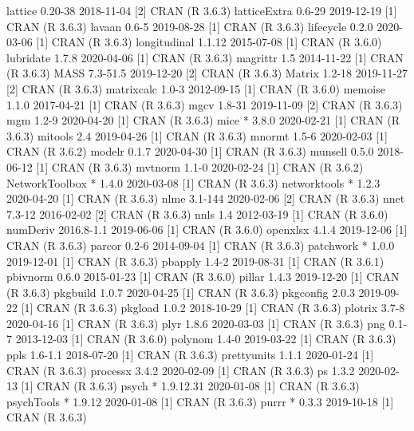 \documentclass[a4paper,12pt]{article} %
\begin{document}
{\begin{Schunk}
\begin{Soutput}
 lattice          0.20-38    2018-11-04 [2] CRAN (R 3.6.3)
 latticeExtra     0.6-29     2019-12-19 [1] CRAN (R 3.6.3)
 lavaan           0.6-5      2019-08-28 [1] CRAN (R 3.6.3)
 lifecycle        0.2.0      2020-03-06 [1] CRAN (R 3.6.3)
 longitudinal     1.1.12     2015-07-08 [1] CRAN (R 3.6.0)
 lubridate        1.7.8      2020-04-06 [1] CRAN (R 3.6.3)
 magrittr         1.5        2014-11-22 [1] CRAN (R 3.6.3)
 MASS             7.3-51.5   2019-12-20 [2] CRAN (R 3.6.3)
 Matrix           1.2-18     2019-11-27 [2] CRAN (R 3.6.3)
 matrixcalc       1.0-3      2012-09-15 [1] CRAN (R 3.6.0)
 memoise          1.1.0      2017-04-21 [1] CRAN (R 3.6.3)
 mgcv             1.8-31     2019-11-09 [2] CRAN (R 3.6.3)
 mgm              1.2-9      2020-04-20 [1] CRAN (R 3.6.3)
 mice           * 3.8.0      2020-02-21 [1] CRAN (R 3.6.3)
 mitools          2.4        2019-04-26 [1] CRAN (R 3.6.3)
 mnormt           1.5-6      2020-02-03 [1] CRAN (R 3.6.2)
 modelr           0.1.7      2020-04-30 [1] CRAN (R 3.6.3)
 munsell          0.5.0      2018-06-12 [1] CRAN (R 3.6.3)
 mvtnorm          1.1-0      2020-02-24 [1] CRAN (R 3.6.2)
 NetworkToolbox * 1.4.0      2020-03-08 [1] CRAN (R 3.6.3)
 networktools   * 1.2.3      2020-04-20 [1] CRAN (R 3.6.3)
 nlme             3.1-144    2020-02-06 [2] CRAN (R 3.6.3)
 nnet             7.3-12     2016-02-02 [2] CRAN (R 3.6.3)
 nnls             1.4        2012-03-19 [1] CRAN (R 3.6.0)
 numDeriv         2016.8-1.1 2019-06-06 [1] CRAN (R 3.6.0)
 openxlsx         4.1.4      2019-12-06 [1] CRAN (R 3.6.3)
 parcor           0.2-6      2014-09-04 [1] CRAN (R 3.6.3)
 patchwork      * 1.0.0      2019-12-01 [1] CRAN (R 3.6.3)
 pbapply          1.4-2      2019-08-31 [1] CRAN (R 3.6.1)
 pbivnorm         0.6.0      2015-01-23 [1] CRAN (R 3.6.0)
 pillar           1.4.3      2019-12-20 [1] CRAN (R 3.6.3)
 pkgbuild         1.0.7      2020-04-25 [1] CRAN (R 3.6.3)
 pkgconfig        2.0.3      2019-09-22 [1] CRAN (R 3.6.3)
 pkgload          1.0.2      2018-10-29 [1] CRAN (R 3.6.3)
 plotrix          3.7-8      2020-04-16 [1] CRAN (R 3.6.3)
 plyr             1.8.6      2020-03-03 [1] CRAN (R 3.6.3)
 png              0.1-7      2013-12-03 [1] CRAN (R 3.6.0)
 polynom          1.4-0      2019-03-22 [1] CRAN (R 3.6.3)
 ppls             1.6-1.1    2018-07-20 [1] CRAN (R 3.6.3)
 prettyunits      1.1.1      2020-01-24 [1] CRAN (R 3.6.3)
 processx         3.4.2      2020-02-09 [1] CRAN (R 3.6.3)
 ps               1.3.2      2020-02-13 [1] CRAN (R 3.6.3)
 psych          * 1.9.12.31  2020-01-08 [1] CRAN (R 3.6.3)
 psychTools     * 1.9.12     2020-01-08 [1] CRAN (R 3.6.3)
 purrr          * 0.3.3      2019-10-18 [1] CRAN (R 3.6.3)

\end{Soutput}
\end{Schunk}}
\end{document}
